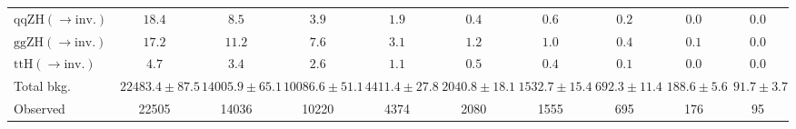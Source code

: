 \begin{tabular}{l|c|c|c|c|c|c|c|c|c}
$\mathrm{qqZH}(\rightarrow \mathrm{inv.})$  & $18.4 $ & $8.5 $ & $3.9 $ & $1.9 $ & $0.4 $ & $0.6 $ & $0.2 $ & $0.0 $ & $0.0 $\\
$\mathrm{ggZH}(\rightarrow \mathrm{inv.})$  & $17.2 $ & $11.2 $ & $7.6 $ & $3.1 $ & $1.2 $ & $1.0 $ & $0.4 $ & $0.1 $ & $0.0 $\\
$\mathrm{ttH}(\rightarrow \mathrm{inv.})$  & $4.7 $ & $3.4 $ & $2.6 $ & $1.1 $ & $0.5 $ & $0.4 $ & $0.1 $ & $0.0 $ & $0.0 $\\
\hline
Total bkg.  & $22483.4\pm87.5$ & $14005.9\pm65.1$ & $10086.6\pm51.1$ & $4411.4\pm27.8$ & $2040.8\pm18.1$ & $1532.7\pm15.4$ & $692.3\pm11.4$ & $188.6\pm5.6$ & $91.7\pm3.7$\\
\hline
Observed & 22505 & 14036 & 10220 & 4374 & 2080 & 1555 & 695 & 176 & 95\\
\hline
\end{tabular}
